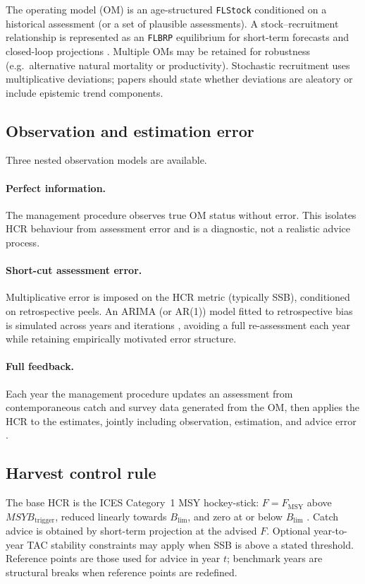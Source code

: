 The operating model (OM) is an age-structured \texttt{FLStock} conditioned on
a historical assessment (or a set of plausible assessments). A stock--recruitment
relationship is represented as an \texttt{FLBRP} equilibrium for short-term
forecasts and closed-loop projections \citep{Kell2007FLR}. Multiple OMs may be
retained for robustness (e.g.\ alternative natural mortality or productivity).
Stochastic recruitment uses multiplicative deviations; papers should state
whether deviations are aleatory or include epistemic trend components.

\subsection{Observation and estimation error}

Three nested observation models are available.

\paragraph{Perfect information.}
The management procedure observes true OM status without error. This isolates
HCR behaviour from assessment error and is a diagnostic, not a realistic advice
process.

\paragraph{Short-cut assessment error.}
Multiplicative error is imposed on the HCR metric (typically SSB), conditioned
on retrospective peels. An ARIMA (or AR(1)) model fitted to retrospective bias
is simulated across years and iterations
\citep{ICES2013EqSim,Kell2016}, avoiding a full re-assessment each year while
retaining empirically motivated error structure.

\paragraph{Full feedback.}
Each year the management procedure updates an assessment from contemporaneous
catch and survey data generated from the OM, then applies the HCR to the
estimates, jointly including observation, estimation, and advice error
\citep{Punt2016MSE}.

\subsection{Harvest control rule}

The base HCR is the ICES Category~1 MSY hockey-stick: \(F=F_{\mathrm{MSY}}\)
above \(MSYB_{\mathrm{trigger}}\), reduced linearly towards \(B_{\lim}\), and
zero at or below \(B_{\lim}\) \citep{ICES2021Advice}. Catch advice is obtained
by short-term projection at the advised \(F\). Optional year-to-year TAC
stability constraints may apply when SSB is above a stated threshold.
Reference points are those used for advice in year \(t\); benchmark years are
structural breaks when reference points are redefined.

